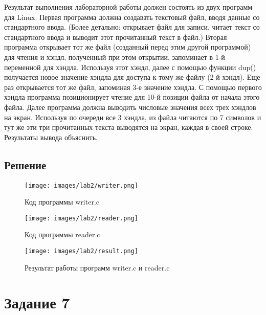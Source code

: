 \documentclass[14pt, a4paper]{article}
\begin{document}
    Результат выполнения лабораторной работы должен состоять из двух программ для Linux. Первая программа должна создавать текстовый файл, вводя данные со стандартного ввода. (Более детально: открывает файл для записи, читает текст со стандартного ввода и выводит этот прочитанный текст в файл.) Вторая программа открывает тот же файл (созданный перед этим другой программой) для чтения и хэндл, полученный при этом открытии, запоминает в 1-й переменной для хэндла. Используя этот хэндл, далее с помощью функции dup() получается новое значение хэндла для доступа к тому же файлу (2-й хэндл). Еще раз открывается тот же файл, запоминая 3-е значение хэндла. С помощью первого хэндла программа позиционирует чтение для 10-й позиции файла от начала этого файла. Далее программа должна выводить числовые значения всех трех хэндлов на экран. Используя по очереди все 3 хэндла, из файла читаются по 7 символов и тут же эти три прочитанных текста выводятся на экран, каждая в своей строке. Результаты вывода объяснить.

    \subsection*{Решение}

    \begin{figure}[H]
        \centering
        \texttt{[image: images/lab2/writer.png]}
        \caption{Код программы writer.c}
    \end{figure}

    \begin{figure}[H]
        \centering
        \texttt{[image: images/lab2/reader.png]}
        \caption{Код программы reader.c}
    \end{figure}

    \begin{figure}[H]
        \centering
        \texttt{[image: images/lab2/result.png]}
        \caption{Результат работы программ writer.c и reader.c}
    \end{figure}

    \newpage

    \section*{Задание 7}
\end{document}
